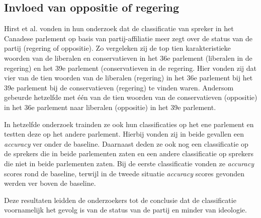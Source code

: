 \subsection{Invloed van oppositie of regering}
Hirst et al. \cite{Hirst_textto} vonden in hun onderzoek dat de classificatie van spreker in het Canadese parlement op basis van partij-affiliatie meer zegt over de status van de partij (regering of oppositie). Zo vergeleken zij de top tien karakteristieke woorden van de liberalen en conservatieven in het 36e parlement (liberalen in de regering) en het 39e parlement (conservatieven in de regering. Hier vonden zij dat vier van de tien woorden van de liberalen (regering) in het 36e parlement bij het 39e parlement bij de conservatieven (regering) te vinden waren. Andersom gebeurde hetzelfde met één van de tien woorden van de conservatieven (oppositie) in het 36e parlement naar liberalen (oppositie) in het 39e parlement.\par
In hetzelfde onderzoek trainden ze ook hun classificaties op het ene parlement en testten deze op het andere parlement. Hierbij vonden zij in beide gevallen een \textit{accuracy} ver onder de baseline. Daarnaast deden ze ook nog een classificatie op de sprekers die in beide parlementen zaten en een andere classificatie op sprekers die niet in beide parlementen zaten. Bij de eerste classificatie vonden ze \textit{accuracy} scores rond de baseline, terwijl in de tweede situatie \textit{accuracy} scores gevonden werden ver boven de baseline. \par
Deze resultaten leidden de onderzoekers tot de conclusie dat de classificatie voornamelijk het gevolg is van de status van de partij en minder van ideologie.\par



